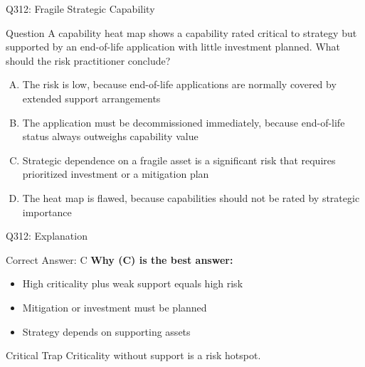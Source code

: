 \documentclass{beamer}
\begin{document}
	\begin{frame}{Q312: Fragile Strategic Capability}
		\begin{block}{Question}
			\small A capability heat map shows a capability rated critical to strategy but supported by an end-of-life application with little investment planned. What should the risk practitioner conclude?
		\end{block}
		\begin{enumerate}[(A)]
			\footnotesize
			\item The risk is low, because end-of-life applications are normally covered by extended support arrangements
			\item The application must be decommissioned immediately, because end-of-life status always outweighs capability value
			\item Strategic dependence on a fragile asset is a significant risk that requires prioritized investment or a mitigation plan
			\item The heat map is flawed, because capabilities should not be rated by strategic importance
		\end{enumerate}
	\end{frame}
	
	\begin{frame}{Q312: Explanation}
		\begin{block}{Correct Answer: C}
			\textbf{Why (C) is the best answer:}
			\begin{itemize}
				\item High criticality plus weak support equals high risk
				\item Mitigation or investment must be planned
				\item Strategy depends on supporting assets
			\end{itemize}
		\end{block}
		\begin{alertblock}{Critical Trap}
			Criticality without support is a risk hotspot.
		\end{alertblock}
	\end{frame}
	
\end{document}
